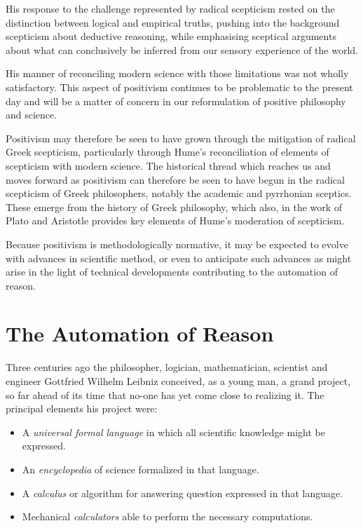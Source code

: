 His response to the challenge represented by radical scepticism rested on the distinction between logical and empirical truths,
pushing into the background scepticism about deductive reasoning, while emphasising sceptical
arguments about what can conclusively be inferred from our sensory experience of the world.

His manner of reconciling modern science with those limitations was not wholly satisfactory.
This aspect of positivism continues to be problematic to the present day and will be
a matter of concern in our reformulation of positive philosophy and science.

Positivism may therefore be seen to have grown through the mitigation of radical
Greek scepticism, particularly through Hume's reconciliation of elements of scepticism
with modern science.
The historical thread which reaches us and moves forward as positivism can
therefore be seen to have begun in the radical scepticism of Greek philosophers,
notably the academic and pyrrhonian sceptics.
These emerge from the history of Greek philosophy, which also, in the work
of Plato and Aristotle provides key elements of Hume's moderation of scepticism.

Because positivism is methodologically normative, it may be expected to evolve with advances
in scientific method, or even to anticipate such advances as might arise in the light of
technical developments contributing to the automation of reason.

\section{The Automation of Reason}

Three centuries ago the philosopher, logician, mathematician,
scientist and engineer Gottfried Wilhelm Leibniz conceived, as a young
man, a grand project, so far ahead of its time that no-one has yet
come close to realizing it.
The principal elements his project were:
\begin{itemize}
\item A {\it universal formal language} in which all scientific
  knowledge might be expressed.
\item An {\it encyclopedia} of science formalized in that language.
\item A {\it calculus} or algorithm for answering question expressed
  in that language.
\item Mechanical {\it calculators} able to perform the necessary computations.
\end{itemize}

